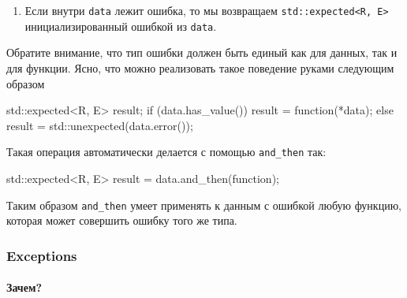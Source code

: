 \begin{enumerate}
\begin{enumerate}
\item Если внутри \verb"data" лежит ошибка, то мы возвращаем \verb"std::expected<R, E>" инициализированный ошибкой из \verb"data".
\end{enumerate}
Обратите внимание, что тип ошибки должен быть единый как для данных, так и для функции.
Ясно, что можно реализовать такое поведение руками следующим образом
\begin{cppcode}
std::expected<R, E> result;
if (data.has_value()) {
  result = function(*data);
} else {
  result = std::unexpected(data.error());
}
\end{cppcode}
Такая операция автоматически делается с помощью \verb"and_then" так:
\begin{cppcode}
std::expected<R, E> result = data.and_then(function);
\end{cppcode}
Таким образом \verb"and_then" умеет применять к данным с ошибкой любую функцию, которая может совершить ошибку того же типа.
\end{enumerate}

\subsubsection{Exceptions}

\paragraph{Зачем?}

